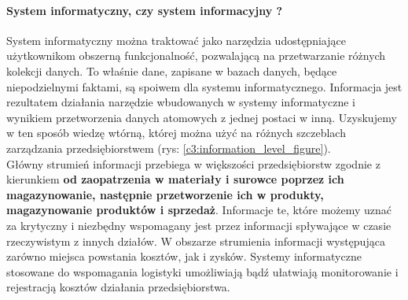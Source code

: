 		\paragraph{System informatyczny, czy system informacyjny ?}
		System informatyczny można traktować jako narzędzia udostępniające użytkownikom 
		obszerną funkcjonalność, pozwalającą na przetwarzanie różnych kolekcji danych.
		To właśnie dane, zapisane w bazach danych, będące niepodzielnymi faktami, są 
		spoiwem dla systemu informatycznego. Informacja jest rezultatem działania
		narzędzie wbudowanych w systemy informatyczne i wynikiem przetworzenia danych 
		atomowych z jednej postaci w inną. Uzyskujemy w ten sposób wiedzę wtórną, której można 
		użyć na różnych szczeblach zarządzania przedsiębiorstwem (rys: \ref{c3:information_level_figure}). \\
		
		Główny strumień informacji przebiega w większości przedsiębiorstw zgodnie z kierunkiem 
		\textbf{od zaopatrzenia w materiały i surowce poprzez ich magazynowanie, następnie przetworzenie ich 
		w produkty, magazynowanie produktów i sprzedaż}. Informacje te, które możemy uznać za krytyczny
		i niezbędny wspomagany jest przez informacji spływające w czasie rzeczywistym z innych działów. 
		W obszarze strumienia informacji występująca zarówno miejsca powstania kosztów, jak i zysków. 
		Systemy informatyczne stosowane do wspomagania logistyki umożliwiają bądź ułatwiają monitorowanie
		i rejestracją kosztów działania przedsiębiorstwa. 
		
